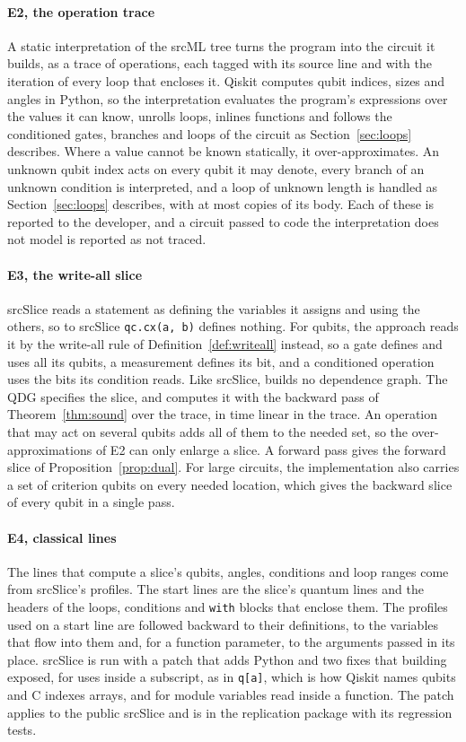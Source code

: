 \paragraph*{E2, the operation trace}
A static interpretation of the srcML tree turns the program into the circuit it builds, as a trace of operations,
each tagged with its source line and with the iteration of every loop that encloses it. Qiskit computes qubit
indices, sizes and angles in Python, so the interpretation evaluates the program's expressions over the values it
can know, unrolls loops, inlines functions and follows the conditioned gates, branches and loops of the circuit as
Section~\ref{sec:loops} describes. Where a value cannot be known statically, it over-approximates. An unknown qubit
index acts on every qubit it may denote, every branch of an unknown condition is interpreted, and a loop of unknown
length is handled as Section~\ref{sec:loops} describes, with at most \numToolMaxCopies{} copies of its body. Each of these is reported to the
developer, and a circuit passed to code the interpretation does not model is reported as not traced.

\paragraph*{E3, the write-all slice}
srcSlice reads a statement as defining the variables it assigns and using the others, so to srcSlice
\texttt{qc.cx(a, b)} defines nothing. For qubits, the approach reads it by the write-all rule of
Definition~\ref{def:writeall} instead, so a gate defines and uses all its qubits, a measurement defines its bit, and
a conditioned operation uses the bits its condition reads. Like srcSlice, \tool{} builds no dependence graph. The QDG
specifies the slice, and \tool{} computes it with the backward pass of Theorem~\ref{thm:sound} over the trace, in
time linear in the trace. An operation that may act on several qubits adds all of them to the needed set, so the
over-approximations of E2 can only enlarge a slice. A forward pass gives the forward slice of
Proposition~\ref{prop:dual}. For large circuits, the implementation also carries a set of criterion qubits on every
needed location, which gives the backward slice of every qubit in a single pass.

\paragraph*{E4, classical lines}
The lines that compute a slice's qubits, angles, conditions and loop ranges come from srcSlice's profiles. The
start lines are the slice's quantum lines and the headers of the loops, conditions and \texttt{with} blocks that
enclose them. The profiles used on a start line are followed backward to their definitions, to the variables that
flow into them and, for a function parameter, to the arguments passed in its place. srcSlice is run with a patch
that adds Python and two fixes that building \tool{} exposed, for uses inside a subscript, as in \texttt{q[a]},
which is how Qiskit names qubits and C indexes arrays, and for module variables read inside a function. The patch applies to the public srcSlice and is in the
replication package with its regression tests.

